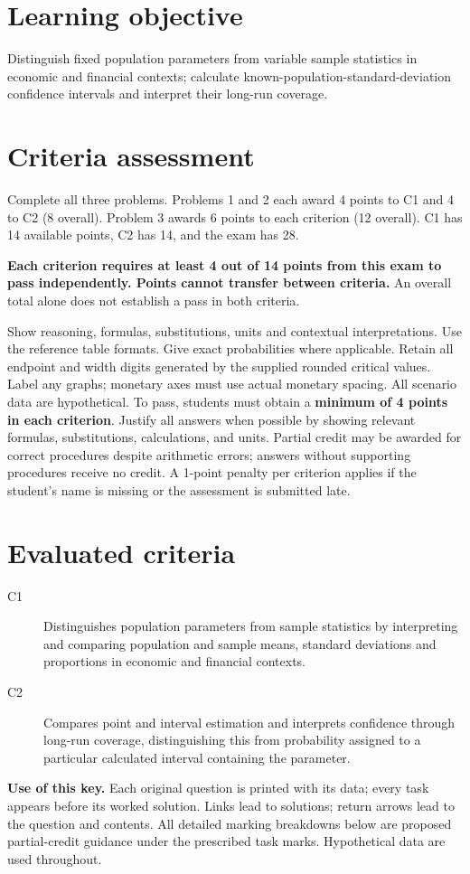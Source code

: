 \maketitle
\setcounter{tocdepth}{1}
\label{toc}\tableofcontents
\section*{Learning objective}
Distinguish fixed population parameters from variable sample statistics in economic and financial contexts; calculate known-population-standard-deviation confidence intervals and interpret their long-run coverage.
\section*{Criteria assessment}
Complete all three problems. Problems 1 and 2 each award 4 points to C1 and 4 to C2 (8 overall). Problem 3 awards 6 points to each criterion (12 overall). C1 has 14 available points, C2 has 14, and the exam has 28.

\textbf{Each criterion requires at least 4 out of 14 points from this exam to pass independently. Points cannot transfer between criteria.} An overall total alone does not establish a pass in both criteria.

Show reasoning, formulas, substitutions, units and contextual interpretations. Use the reference table formats. Give exact probabilities where applicable. Retain all endpoint and width digits generated by the supplied rounded critical values. Label any graphs; monetary axes must use actual monetary spacing. All scenario data are hypothetical.
To pass, students must obtain a \textbf{minimum of 4 points in each criterion}. Justify all answers when possible by showing relevant formulas, substitutions, calculations, and units. Partial credit may be awarded for correct procedures despite arithmetic errors; answers without supporting procedures receive no credit. A 1-point penalty per criterion applies if the student's name is missing or the assessment is submitted late.

\section*{Evaluated criteria}
\begin{description}
\item[C1] Distinguishes population parameters from sample statistics by interpreting and comparing population and sample means, standard deviations and proportions in economic and financial contexts.
\item[C2] Compares point and interval estimation and interprets confidence through long-run coverage, distinguishing this from probability assigned to a particular calculated interval containing the parameter.
\end{description}
\clearpage
\textbf{Use of this key.} Each original question is printed with its data; every task appears before its worked solution. Links lead to solutions; return arrows lead to the question and contents. All detailed marking breakdowns below are proposed partial-credit guidance under the prescribed task marks. Hypothetical data are used throughout.
